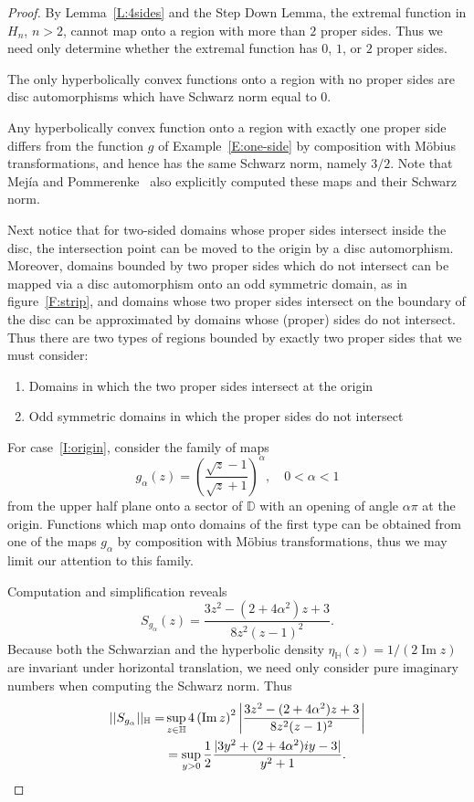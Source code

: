 \documentclass{lms}
\newcommand{\D}{\mathbb D}
\newcommand{\HH}{\mathbb H}
\newcommand{\abs}[1]{\lvert#1\rvert}
\newcommand{\norm}[1]{\lvert\lvert#1\rvert\rvert}
\DeclareMathOperator{\im}{Im}
\numberwithin{equation}{section}
\begin{document}
\begin{proof}

By Lemma~\ref{L:4sides} 
and the Step Down Lemma, the extremal function in $H_n$, $n>2$, cannot
map onto a region with more than $2$ proper sides.  Thus we need only
determine whether the extremal function has $0$, $1$, or $2$ proper sides.

The only hyperbolically convex functions onto a region with no proper sides
are disc automorphisms which have
Schwarz norm equal to $0$.

Any hyperbolically convex function onto a region with exactly one proper side
differs from the function $g$ of Example~\ref{E:one-side} by 
composition with M\"obius transformations,
and hence has the same Schwarz norm, namely $3/2$.  Note that 
Mej\'ia and Pommerenke~\cite{PM00} also explicitly computed these maps
and their Schwarz norm.


Next notice that for two-sided domains whose proper sides 
intersect inside the disc, the intersection point
can be moved to the origin by a disc automorphism.
Moreover, domains bounded by two proper sides which
do not intersect 
can be mapped via a disc automorphism onto an odd symmetric domain,
as in figure~\ref{F:strip},
and domains whose two proper sides intersect on the boundary of the disc 
can be approximated by domains whose (proper) sides do not  intersect.  
Thus there are two types of regions bounded by exactly two proper sides that we
must consider: 
\begin{enumerate}
\item \label{I:origin}  Domains 
in which the two proper sides intersect at the origin
\item Odd symmetric domains in which the proper sides do not intersect
\end{enumerate}

For case~\eqref{I:origin}, consider the family of maps
\[
g_\alpha(z)= \left(\frac{\sqrt{z}-1}{\sqrt{z}+1}\right)^\alpha,\quad
0<\alpha<1
\]
from the upper half plane onto a sector of $\D$ with an opening of 
angle $\alpha\pi$ at the origin.
Functions which map onto domains of the first type can be obtained from
one of the maps $g_\alpha$ by composition with M\"obius transformations, thus
we may limit our attention to this family.

Computation and simplification reveals
\[
S_{g_\alpha}(z)=\frac{3z^2-(2+4\alpha^2)z +3}{8z^2(z-1)^2}.
\]
Because both the Schwarzian and the hyperbolic density $\eta_\HH(z)=1/(2\im{z})$
are invariant under horizontal translation, we need only consider
pure imaginary numbers when computing the Schwarz norm.
Thus
\begin{align}\notag
\norm{S_{g_\alpha}}_\HH=&\sup_{z\in\HH} 4\left(\im z\right)^2
\left|\frac{3z^2-(2+4\alpha^2)z +3}{8z^2(z-1)^2}\right| \\\notag
&=\sup_{y>0} \frac{1}{2}\frac{\abs{3y^2+(2+4\alpha^2)iy -3}}{y^2+1}.
\end{align}


\end{proof}
\end{document}
